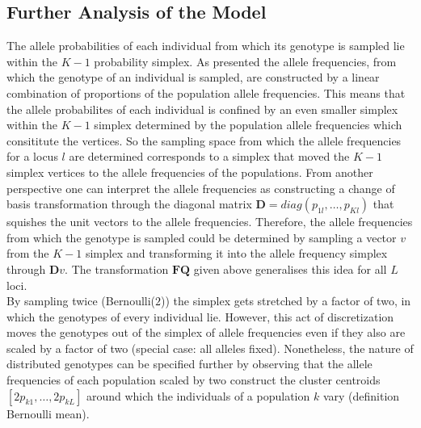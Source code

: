 \documentclass[a4paper, 11pt]{article}
\begin{document}
\subsection{Further Analysis of the Model}
The allele probabilities of each individual from which its genotype is sampled lie within the $K-1$ probability simplex. As presented the allele frequencies, from which the genotype of an individual is sampled, are constructed by a linear combination of proportions of the population allele frequencies. This means that the allele probabilites of each individual is confined by an even smaller simplex within the $K-1$ simplex determined by the population allele frequencies which consititute the vertices. So the sampling space from which the allele frequencies for a locus $l$ are determined corresponds to a simplex that moved the $K-1$ simplex vertices to the allele frequencies of the populations. From another perspective one can interpret the allele frequencies as constructing a change of basis transformation through the diagonal matrix $\mathbf{D} = diag(p_{1l}, \ldots, p_{Kl})$ that squishes the unit vectors to the allele frequencies. Therefore, the allele frequencies from which the genotype is sampled could be determined by sampling a vector $v$ from the $K-1$ simplex and transforming it into the allele frequency simplex through $\mathbf{D}v$.  The transformation $\mathbf{F}\mathbf{Q}$ given above generalises this idea for all $L$ loci.\\
By sampling twice (Bernoulli($2$)) the simplex gets stretched by a factor of two, in which the genotypes of every individual lie. However, this act of discretization moves the genotypes out of the simplex of allele frequencies even if they also are scaled by a factor of two (special case: all alleles fixed). Nonetheless, the nature of distributed genotypes can be specified further by observing that the allele frequencies of each population scaled by two construct the cluster centroids $[2p_{k1}, \ldots, 2p_{kL}]$ around which the individuals of a population $k$ vary (definition Bernoulli mean).\\
\end{document}
